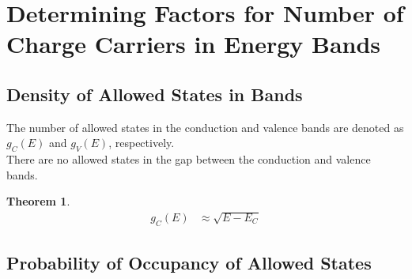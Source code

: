 \documentclass[titlepage, fleqn, a4paper, 12pt, twoside]{article}
\theoremstyle{definition}
\theoremstyle{theorem}
\newtheorem{theorem}{Theorem}
\begin{document}
\section{Determining Factors for Number of Charge Carriers in Energy Bands}

\subsection{Density of Allowed States in Bands}

The number of allowed states in the conduction and valence bands are denoted as $g_C(E)$ and $g_V(E)$, respectively.\\
There are no allowed states in the gap between the conduction and valence bands.

\begin{theorem}
	\begin{align*}
		g_C(E) & \approx \sqrt{E - E_C}
	\end{align*}
\end{theorem}

\subsection{Probability of Occupancy of Allowed States}
\end{document}
